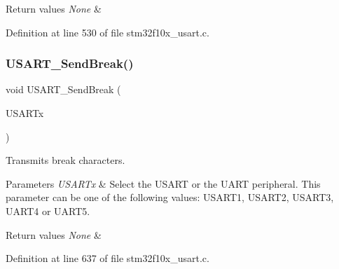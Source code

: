 \begin{DoxyRetVals}{Return values}
{\em None} & \\
\hline
\end{DoxyRetVals}


Definition at line 530 of file stm32f10x\+\_\+usart.\+c.

\mbox{\label{group___u_s_a_r_t___private___functions_ga39a3d33e23ee28529fa8f7259ce6811e}} 
\subsubsection{\texorpdfstring{U\+S\+A\+R\+T\+\_\+\+Send\+Break()}{USART\_SendBreak()}}
{\footnotesize\ttfamily void U\+S\+A\+R\+T\+\_\+\+Send\+Break (\begin{DoxyParamCaption}\item[{\hyperlink{struct_u_s_a_r_t___type_def}{U\+S\+A\+R\+T\+\_\+\+Type\+Def} $\ast$}]{U\+S\+A\+R\+Tx }\end{DoxyParamCaption})}



Transmits break characters. 


\begin{DoxyParams}{Parameters}
{\em U\+S\+A\+R\+Tx} & Select the U\+S\+A\+RT or the U\+A\+RT peripheral. This parameter can be one of the following values\+: U\+S\+A\+R\+T1, U\+S\+A\+R\+T2, U\+S\+A\+R\+T3, U\+A\+R\+T4 or U\+A\+R\+T5. \\
\hline
\end{DoxyParams}

\begin{DoxyRetVals}{Return values}
{\em None} & \\
\hline
\end{DoxyRetVals}


Definition at line 637 of file stm32f10x\+\_\+usart.\+c.

\mbox{\label{group___u_s_a_r_t___private___functions_ga0b43d42da9540f446d494bf69823c6fb}} 
